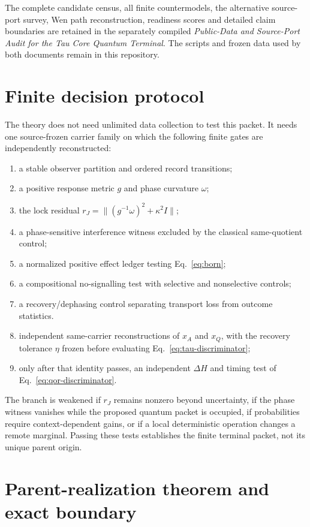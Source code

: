 \documentclass[11pt]{article}
\begin{document}
The complete candidate census, all finite countermodels, the alternative
source-port survey, Wen path reconstruction, readiness scores and detailed
claim boundaries are retained in the separately compiled
\emph{Public-Data and Source-Port Audit for the Tau Core Quantum Terminal}.
The scripts and frozen data used by both documents remain in this repository.

\section{Finite decision protocol}

The theory does not need unlimited data collection to test this packet.  It
needs one source-frozen carrier family on which the following finite gates are
independently reconstructed:
\begin{enumerate}[label=(F\arabic*)]
\item a stable observer partition and ordered record transitions;
\item a positive response metric $g$ and phase curvature $\omega$;
\item the lock residual
$r_J=\| (g^{-1}\omega)^2+\kappa^2I\|$;
\item a phase-sensitive interference witness excluded by the classical
same-quotient control;
\item a normalized positive effect ledger testing Eq.~\eqref{eq:born};
\item a compositional no-signalling test with selective and nonselective
controls;
\item a recovery/dephasing control separating transport loss from outcome
statistics.
\item independent same-carrier reconstructions of $x_A$ and $x_Q$, with the
recovery tolerance $\eta$ frozen before evaluating
Eq.~\eqref{eq:tau-discriminator};
\item only after that identity passes, an independent $\Delta H$ and timing
test of Eq.~\eqref{eq:qor-discriminator}.
\end{enumerate}

The branch is weakened if $r_J$ remains nonzero beyond uncertainty, if the
phase witness vanishes while the proposed quantum packet is occupied, if
probabilities require context-dependent gains, or if a local deterministic
operation changes a remote marginal.  Passing these tests establishes the
finite terminal packet, not its unique parent origin.

\section{Parent-realization theorem and exact boundary}
\end{document}
